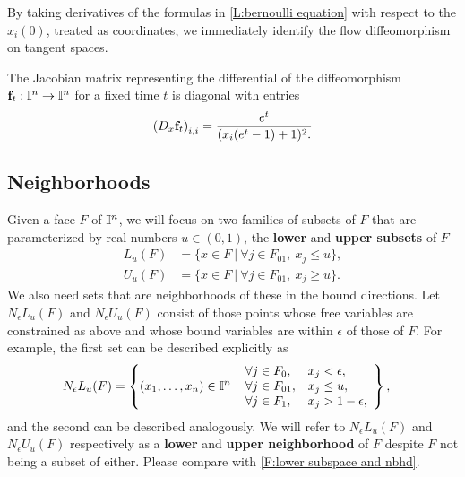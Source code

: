 By taking derivatives of the formulas in \cref{L:bernoulli equation} with respect to the $x_i(0)$, treated as coordinates, we immediately identify the flow diffeomorphism on tangent spaces.

\begin{corollary}\label{C:pushforward of vectors along the flow}
	The Jacobian matrix representing the differential of the diffeomorphism $\mathbf{f}_t:\mathbb{I}^n \to \mathbb{I}^n$ for a fixed time $t$	is diagonal with entries
	\begin{equation*}
		\left(D_x \mathbf{f}_t\right)_{i,i} = \frac{e^t}{(x_i(e^t -1) + 1)^2.}
	\end{equation*}
\end{corollary}

\subsection{Neighborhoods}\label{S:neighborhoods}

Given a face $F$ of $\mathbb{I}^n$, we will focus on two families of subsets of $F$ that are parameterized by real numbers $u \in (0,1)$, the \textbf{lower} and \textbf{upper subsets} of $F$
\begin{align*}
	L_u(F) & = \{x \in F\ |\ \forall j \in F_{01},\ x_j \leq u\}, \\
	U_u(F) & = \{x \in F\ |\ \forall j \in F_{01},\ x_j \geq u\}.
\end{align*}
We also need sets that are neighborhoods of these in the bound directions.
Let $N_\epsilon L_u(F)$ and $N_\epsilon U_u(F)$ consist of those points whose free variables are constrained as above and whose bound variables are within $\epsilon$ of those of $F$.
For example, the first set can be described explicitly as
\begin{align*}
	N_\epsilon L_u (F) & = \left\{(x_1,\ldots, x_n) \in \interval^n\ \middle|
	\begin{array}{ll}
		\forall j \in F_0, & x_j < \epsilon, \\
		\forall j \in F_{01}, & x_j \leq u, \\
		\forall j \in F_1, & x_j>1-\epsilon,
	\end{array}\right\},
\end{align*}
and the second can be described analogously.
We will refer to $N_\epsilon L_u(F)$ and $N_\epsilon U_u(F)$ respectively as a \textbf{lower} and \textbf{upper neighborhood} of $F$ despite $F$ not being a subset of either.
Please compare with \cref{F:lower subspace and nbhd}.

